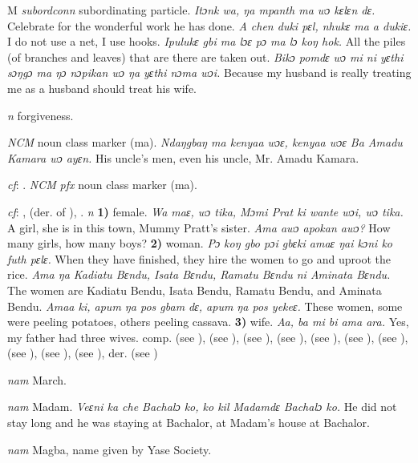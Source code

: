 \begin{letter}{M}
 \textit{subordconn} subordinating particle. \textit{Itɔnk wa, ŋa mpanth ma wɔ kɛlɛn dɛ.} Celebrate for the wonderful work he has done. \textit{A chen duki pɛl, nhukɛ ma a dukiɛ.} I do not use a net, I use hooks. \textit{Ipulukɛ gbi ma lɔɛ pɔ ma lɔ koŋ hok.} All the piles (of branches and leaves) that are there are taken out. \textit{Bikɔ pomdɛ wɔ mi ni yɛthi sɔŋgɔ ma ŋɔ nɔpikan wɔ ŋa yɛthi nɔma wɔi.} Because my husband is really treating me as a husband should treat his wife.

 \textit{n} forgiveness.

 \textit{NCM} noun class marker (ma). \textit{Ndaŋgbaŋ ma kenyaa wɔɛ, kenyaa wɔɛ Ba Amadu Kamara wɔ ayɛn.} His uncle's men, even his uncle, Mr. Amadu Kamara.

 \textit{cf}: . \textit{NCM} \textit{pfx} noun class marker (ma).

 \textit{cf}: ,  (der. of ), . \textit{n} \textbf{1)} female. \textit{Wa maɛ, wɔ tika, Mɔmi Prat ki wante wɔi, wɔ tika.} A girl, she is in this town, Mummy Pratt's sister. \textit{Ama awɔ apokan awɔ?} How many girls, how many boys? \textbf{2)} woman. \textit{Pɔ koŋ gbo pɔi gbɛki amaɛ ŋai kɔni ko futh pɛlɛ.} When they have finished, they hire the women to go and uproot the rice. \textit{Ama ŋa Kadiatu Bɛndu, Isata Bɛndu, Ramatu Bɛndu ni Aminata Bɛndu.} The women are Kadiatu Bendu, Isata Bendu, Ramatu Bendu, and Aminata Bendu. \textit{Amaa ki, apum ŋa pos gbam dɛ, apum ŋa pos yekeɛ.} These women, some were peeling potatoes, others peeling cassava. \textbf{3)} wife. \textit{Aa, ba mi bi ama ara.} Yes, my father had three wives. comp.  (see ),  (see ),  (see ),  (see ),  (see ),  (see ),  (see ),  (see ),  (see ),  (see ), der.  (see ) 

 \textit{nam} March.

 \textit{nam} Madam. \textit{Veɛni ka che Bachalɔ ko, ko kil Madamdɛ Bachalɔ ko.} He did not stay long and he was staying at Bachalor, at Madam's house at Bachalor.

 \textit{nam} Magba, name given by Yase Society.


\end{letter}
